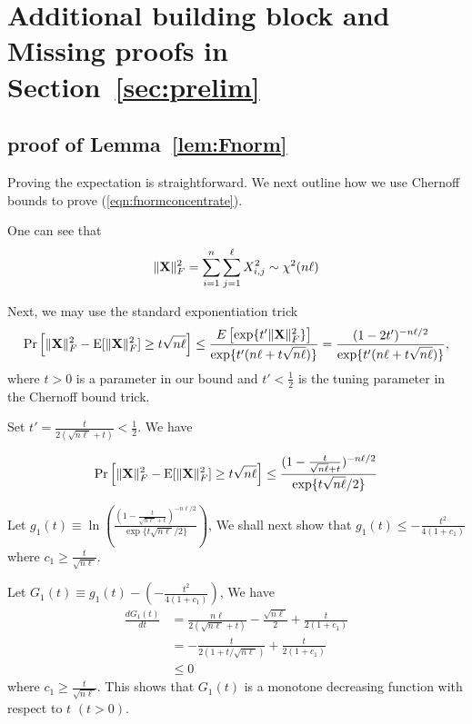 \section{Additional building block and Missing proofs in Section~\ref{sec:prelim} }\label{asec:missingprelim}

\subsection{proof of Lemma~\ref{lem:Fnorm}}
Proving the expectation is straightforward. We next outline how we use Chernoff bounds to prove (\ref{eqn:fnormconcentrate}). 

One can see that
\begin{equation}
    \|\mathbf{X}\|^2_F = \sum^n_{i=1}\sum^{\ell}_{j=1} X^2_{i,j} \sim \chi^2(n \ell)
\end{equation}


Next, we may use the standard exponentiation trick 
\begin{equation}
     \Pr\left[ \|\mathbf{X}\|^2_F - \mathrm{E}[\|\mathbf{X}\|^2_F] \geq t \sqrt{n\ell} \right] 
     \leq \frac{E\left[\exp \{t'\|\mathbf{X}\|^2_F\} \right]}{\exp \{t' (n\ell + t \sqrt{n\ell})\}} 
     = \frac{(1-2t')^{-n\ell/2}}{\exp \{t' (n\ell + t \sqrt{n\ell})\}}, 
\end{equation}
where $t > 0$ is a parameter in our bound and $t' < \frac 1 2$ is the tuning parameter in the Chernoff bound trick. 


Set $t' = \frac{t}{2(\sqrt{n\ell}+t)} < \frac{1}{2}$. We have

\begin{equation}
\begin{split}
     \Pr\left[ \|\mathbf{X}\|^2_F - \mathrm{E}[\|\mathbf{X}\|^2_F] \geq t \sqrt{n\ell} \right] 
     \leq \frac{(1-\frac{t}{\sqrt{n\ell}+t})^{-n\ell/2}}{\exp \{t\sqrt{n\ell}/2\}} 
\end{split}
\end{equation}

Let $g_1(t)\equiv \ln \left( \frac{(1-\frac{t}{\sqrt{n\ell}+t})^{-n\ell/2}}{\exp \{t\sqrt{n\ell}/2\}}\right)$, We shall next show that $g_1(t) \leq -\frac{t^2}{4(1+c_1)}$ where $c_1 \geq \frac{t}{\sqrt{n\ell}}$.

Let $G_1(t) \equiv g_1(t) - \left( -\frac{t^2}{4(1+c_1)}\right) $,
We have
\begin{equation}
\begin{split}
    \frac{dG_1(t)}{dt} 
    &= \frac{n\ell}{2(\sqrt{n\ell}+t)} - \frac{\sqrt{n\ell}}{2}+\frac{t}{2(1+c_1)} \\
    &= -\frac{t}{2(1+t/\sqrt{n\ell})} + \frac{t}{2(1+c_1)} \\
    & \leq 0
\end{split}
\end{equation}
where $c_1 \geq \frac{t}{\sqrt{n\ell}}$. This shows that $G_1(t)$ is a monotone decreasing function with respect to $t$ $(t>0)$.

